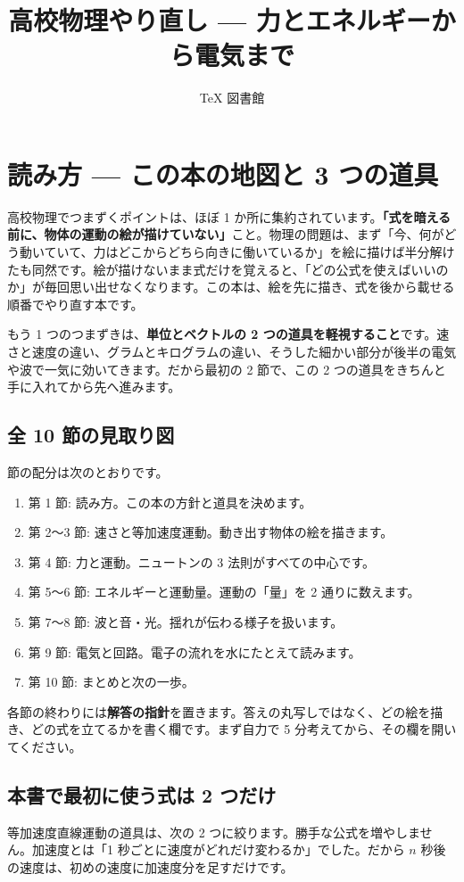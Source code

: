 \documentclass{article}
\title{高校物理やり直し — 力とエネルギーから電気まで}
\author{TeX 図書館}
\begin{document}
\section{読み方 — この本の地図と 3 つの道具}

高校物理でつまずくポイントは、ほぼ 1 か所に集約されています。\textbf{「式を暗える前に、物体の運動の絵が描けていない」}こと。物理の問題は、まず「今、何がどう動いていて、力はどこからどちら向きに働いているか」を絵に描けば半分解けたも同然です。絵が描けないまま式だけを覚えると、「どの公式を使えばいいのか」が毎回思い出せなくなります。この本は、絵を先に描き、式を後から載せる順番でやり直す本です。

もう 1 つのつまずきは、\textbf{単位とベクトルの 2 つの道具を軽視すること}です。速さと速度の違い、グラムとキログラムの違い、そうした細かい部分が後半の電気や波で一気に効いてきます。だから最初の 2 節で、この 2 つの道具をきちんと手に入れてから先へ進みます。

\subsection{全 10 節の見取り図}

節の配分は次のとおりです。

\begin{enumerate}
\item 第 1 節: 読み方。この本の方針と道具を決めます。
\item 第 2〜3 節: 速さと等加速度運動。動き出す物体の絵を描きます。
\item 第 4 節: 力と運動。ニュートンの 3 法則がすべての中心です。
\item 第 5〜6 節: エネルギーと運動量。運動の「量」を 2 通りに数えます。
\item 第 7〜8 節: 波と音・光。揺れが伝わる様子を扱います。
\item 第 9 節: 電気と回路。電子の流れを水にたとえて読みます。
\item 第 10 節: まとめと次の一歩。
\end{enumerate}

各節の終わりには\textbf{解答の指針}を置きます。答えの丸写しではなく、どの絵を描き、どの式を立てるかを書く欄です。まず自力で 5 分考えてから、その欄を開いてください。

\subsection{本書で最初に使う式は 2 つだけ}

等加速度直線運動の道具は、次の 2 つに絞ります。勝手な公式を増やしません。加速度とは「1 秒ごとに速度がどれだけ変わるか」でした。だから \( n \) 秒後の速度は、初めの速度に加速度分を足すだけです。
\end{document}
